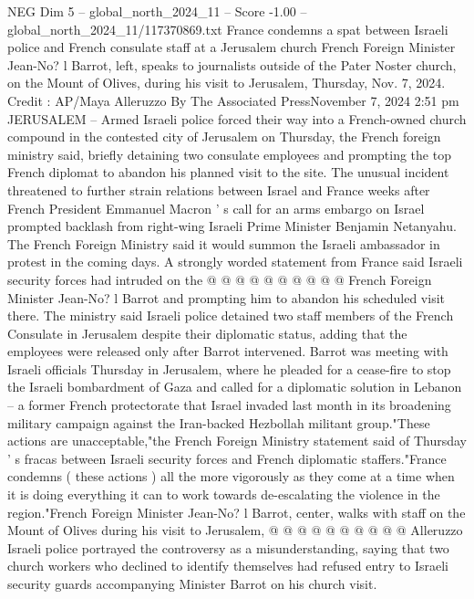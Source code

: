 \begin{textsample}{NEG Dim 5 – global\_north\_2024\_11 – Score -1.00 – global\_north\_2024\_11/117370869.txt}  \label{ex:f5_neg_422}
France condemns a spat between Israeli police and French consulate staff at a Jerusalem church French Foreign Minister Jean-No? l Barrot, left, speaks to journalists outside of the Pater Noster church, on the Mount of Olives, during his visit to Jerusalem, Thursday, Nov. 7, 2024.
Credit : AP/Maya Alleruzzo By The Associated PressNovember 7, 2024 2:51 pm JERUSALEM -- Armed Israeli police forced their way into a French-owned church compound in the contested city of Jerusalem on Thursday, the French foreign ministry said, briefly detaining two consulate employees and prompting the top French diplomat to abandon his planned visit to the site.
The unusual incident threatened to further strain relations between Israel and France weeks after French President Emmanuel Macron ' s call for an arms embargo on Israel prompted backlash from right-wing Israeli Prime Minister Benjamin Netanyahu.
The French Foreign Ministry said it would summon the Israeli ambassador in protest in the coming days.
A strongly worded statement from France said Israeli security forces had intruded on the @ @ @ @ @ @ @ @ @ @ French Foreign Minister Jean-No? l Barrot and prompting him to abandon his scheduled visit there.
The ministry said Israeli police detained two staff members of the French Consulate in Jerusalem despite their diplomatic status, adding that the employees were released only after Barrot intervened.
Barrot was meeting with Israeli officials Thursday in Jerusalem, where he pleaded for a cease-fire to stop the Israeli bombardment of Gaza and called for a diplomatic solution in Lebanon -- a former French protectorate that Israel invaded last month in its broadening military campaign against the Iran-backed Hezbollah militant group."These actions are unacceptable,"the French Foreign Ministry statement said of Thursday ' s fracas between Israeli security forces and French diplomatic staffers."France condemns ( these actions ) all the more vigorously as they come at a time when it is doing everything it can to work towards de-escalating the violence in the region."French Foreign Minister Jean-No? l Barrot, center, walks with staff on the Mount of Olives during his visit to Jerusalem, @ @ @ @ @ @ @ @ @ @ Alleruzzo Israeli police portrayed the controversy as a misunderstanding, saying that two church workers who declined to identify themselves had refused entry to Israeli security guards accompanying Minister Barrot on his church visit.

\end{textsample}
